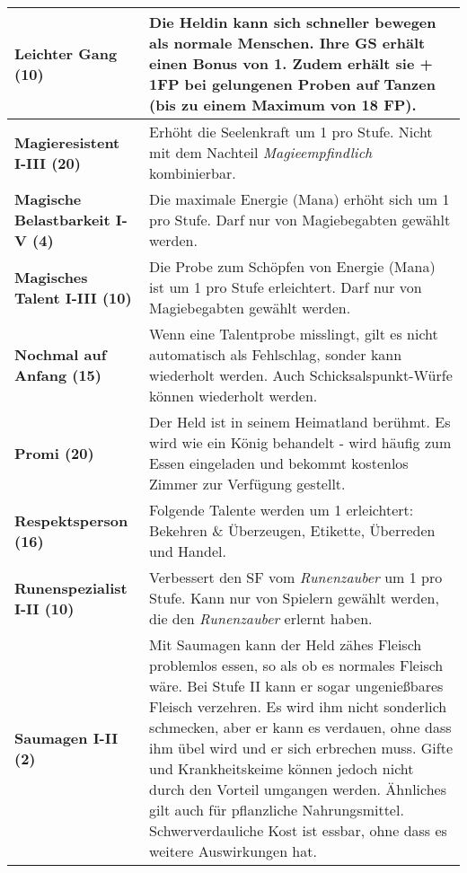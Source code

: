 \begin{longtable}{|p{5cm}|p{11cm}|}
\textbf{Leichter Gang (10)} & Die Heldin kann sich schneller bewegen als normale Menschen. Ihre GS erhält einen Bonus von 1. Zudem erhält sie + 1FP bei gelungenen Proben auf Tanzen (bis zu einem Maximum von 18 FP). \\ \hline

\textbf{Magieresistent I-III (20)} & Erhöht die Seelenkraft um 1 pro Stufe. Nicht mit dem Nachteil \textit{Magieempfindlich} kombinierbar. \\ \hline

\textbf{Magische Belastbarkeit I-V (4)} & Die maximale Energie (Mana) erhöht sich um 1 pro Stufe. Darf nur von Magiebegabten gewählt werden. \\ \hline

\textbf{Magisches Talent I-III (10)} & Die Probe zum Schöpfen von Energie (Mana) ist um 1 pro Stufe erleichtert. Darf nur von Magiebegabten gewählt werden. \\ \hline 

\textbf{Nochmal auf Anfang (15)} & Wenn eine Talentprobe misslingt, gilt es nicht automatisch als Fehlschlag, sonder kann wiederholt werden. Auch Schicksalspunkt-Würfe können wiederholt werden. \\ \hline

\textbf{Promi (20)} & Der Held ist in seinem Heimatland berühmt. Es wird wie ein König behandelt - wird häufig zum Essen eingeladen und bekommt kostenlos Zimmer zur Verfügung gestellt. \\ \hline

\textbf{Respektsperson (16)} & Folgende Talente werden um 1 erleichtert: Bekehren \& Überzeugen, Etikette, Überreden und Handel. \\ \hline

\textbf{Runenspezialist I-II (10)} & Verbessert den SF vom \textit{Runenzauber} um 1 pro Stufe. Kann nur von Spielern gewählt werden, die den \textit{Runenzauber} erlernt haben. \\ \hline

\textbf{Saumagen I-II (2)} & Mit Saumagen kann der Held zähes Fleisch problemlos essen, so als ob es normales Fleisch wäre. Bei Stufe II kann er sogar ungenießbares Fleisch verzehren. Es wird ihm nicht sonderlich schmecken, aber er kann es verdauen, ohne dass ihm übel wird und er sich erbrechen muss. Gifte und Krankheitskeime können jedoch nicht durch den Vorteil umgangen werden. Ähnliches gilt auch für pflanzliche Nahrungsmittel. Schwerverdauliche Kost ist essbar, ohne dass es weitere Auswirkungen hat. \\ \hline


\end{longtable}
